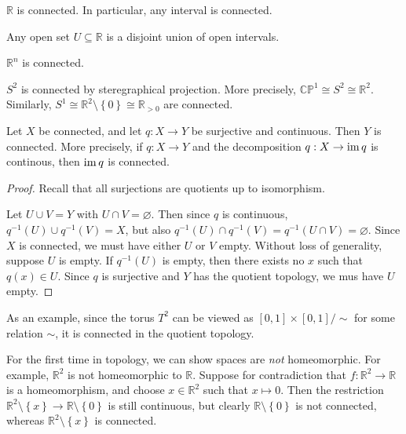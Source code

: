 \begin{theorem}\label{thm:4.5}
	$\mathbb{R} $ is connected. In particular, any interval is connected.
\end{theorem}
\begin{corollary}\label{cor:4.1}
	Any open set $U\subseteq \mathbb{R} $ is a disjoint union of open intervals.
\end{corollary}
\begin{corollary}\label{cor:4.2}
	$\mathbb{R} ^n$ is connected.
\end{corollary}
\begin{corollary}\label{cor:4.3}
	$S^2$ is connected by steregraphical projection. More precisely, $\mathbb{C} \mathbb{P} ^1\cong S^2\cong \mathbb{R} ^2$. Similarly, $S^1 \cong \mathbb{R} ^2\setminus \left\{ 0 \right\} \cong \mathbb{R}_{>0} $ are connected.
\end{corollary}

\begin{theorem}\label{thm:4.6}
	Let $X$ be connected, and let $q : X \to Y$ be surjective and continuous. Then $Y$ is connected. More precisely, if $q : X \to Y$ and the decomposition $q : X \to \operatorname{im} q$ is continous, then $\operatorname{im} q$ is connected.
\end{theorem}
\begin{proof}
	Recall that all surjections are quotients up to isomorphism.

	Let $U \cup V=Y$ with $U \cap V=\varnothing $. Then since $q$ is continuous, $q^{-1} (U) \cup q^{-1} (V)=X$, but also $q^{-1} (U) \cap q^{-1} (V) = q^{-1} (U \cap V)=\varnothing $. Since $X$ is connected, we must have either $U$ or $V$ empty. Without loss of generality, suppose $U$ is empty. If $q^{-1} (U)$ is empty, then there exists no $x$ such that $q(x)\in U$. Since $q$ is surjective and $Y$ has the quotient topology, we mus have $U$ empty.
\end{proof}

As an example, since the torus $T^2$ can be viewed as $[0,1]\times [0,1]/\sim $ for some relation $\sim $, it is connected in the quotient topology.

For the first time in topology, we can show spaces are \emph{not} homeomorphic. For example, $\mathbb{R} ^2$ is not homeomorphic to $\mathbb{R} $. Suppose for contradiction that $f : \mathbb{R} ^2 \to \mathbb{R} $ is a homeomorphism, and choose $x\in \mathbb{R} ^2$ such that $x\mapsto 0$. Then the restriction $\mathbb{R} ^2\setminus \left\{ x \right\} \to \mathbb{R} \setminus \left\{ 0 \right\} $ is still continuous, but clearly $\mathbb{R} \setminus \left\{ 0 \right\} $ is not connected, whereas $\mathbb{R} ^2\setminus \left\{ x \right\} $ is connected.

